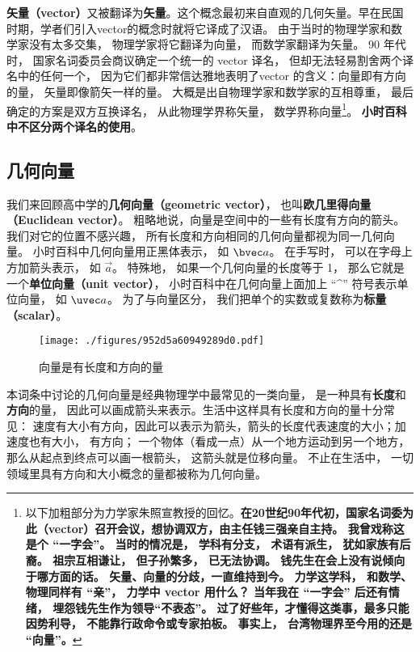 


\textbf{矢量（vector）}又被翻译为\textbf{矢量}。这个概念最初来自直观的几何矢量。早在民国时期，学者们引入vector的概念时就将它译成了汉语。 由于当时的物理学家和数学家没有太多交集， 物理学家将它翻译为向量， 而数学家翻译为矢量。 90 年代时， 国家名词委员会商议确定一个统一的 vector 译名， 但却无法轻易割舍两个译名中的任何一个， 因为它们都非常信达雅地表明了vector 的含义：向量即有方向的量， 矢量即像箭矢一样的量。 大概是出自物理学家和数学家的互相尊重， 最后确定的方案是双方互换译名， 从此物理学界称矢量， 数学界称向量\footnote{以下加粗部分为力学家朱照宣教授的回忆。\textbf{在20世纪90年代初，国家名词委为此（vector）召开会议，想协调双方，由主任钱三强亲自主持。 我曾戏称这是个 “一字会”。 当时的情况是， 学科有分支， 术语有派生， 犹如家族有后裔。 祖宗互相谦让， 但子孙繁多， 已无法协调。 钱先生在会上没有说倾向于哪方面的话。 矢量、向量的分歧，一直维持到今。 力学这学科， 和数学、物理同样有 “亲”， 力学中 vector 用什么？ 当年我在 “一字会” 后还有情绪， 埋怨钱先生作为领导“不表态”。 过了好些年，才懂得这类事，最多只能因势利导， 不能靠行政命令或专家拍板。 事实上， 台湾物理界至今用的还是 “向量”。}}。 \textbf{小时百科中不区分两个译名的使用}。


\subsection{几何向量}

我们来回顾高中学的\textbf{几何向量（geometric vector）}， 也叫\textbf{欧几里得向量（Euclidean vector）}。 粗略地说，向量是空间中的一些有长度有方向的箭头。 我们对它的位置不感兴趣， 所有长度和方向相同的几何向量都视为同一几何向量。 小时百科中几何向量用正黑体表示， 如 $\bvec a$。 在手写时， 可以在字母上方加箭头表示， 如 $\overrightarrow{a}$。 特殊地， 如果一个几何向量的长度等于 1， 那么它就是一个\textbf{单位向量（unit vector）}， 小时百科中在几何向量上面加上 “\^{}” 符号表示单位向量， 如 $\uvec a$。 为了与向量区分， 我们把单个的实数或复数称为\textbf{标量（scalar）}。

\begin{figure}[ht]
\centering
\texttt{[image: ./figures/952d5a60949289d0.pdf]}
\caption{向量是有长度和方向的量} \label{fig_GVec_4}
\end{figure}
本词条中讨论的几何向量是经典物理学中最常见的一类向量， 是一种具有\textbf{长度}和\textbf{方向}的量， 因此可以画成箭头来表示。生活中这样具有长度和方向的量十分常见： 速度有大小有方向，因此可以表示为箭头，箭头的长度代表速度的大小；加速度也有大小， 有方向； 一个物体（看成一点）从一个地方运动到另一个地方，那么从起点到终点可以画一根箭头， 这箭头就是位移向量。 不止在生活中， 一切领域里具有方向和大小概念的量都被称为几何向量。 

